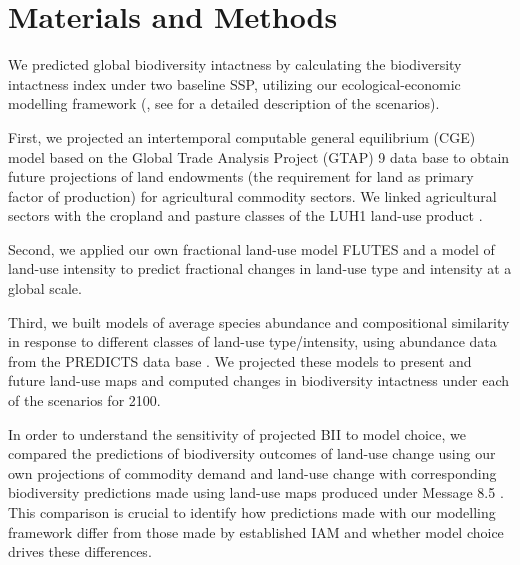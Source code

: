 \documentclass[titlesmallcaps,copyrightpage]{uomthesis}\usepackage[]{graphicx}\usepackage[]{color}
\begin{document}
\section{Materials and Methods}
We predicted global biodiversity intactness by calculating the biodiversity intactness index \citep[BII,][]{scholes_biodiversity_2005} under two baseline SSP, utilizing our ecological-economic modelling framework (, see  for a detailed description of the scenarios).

First, we projected an intertemporal computable general equilibrium (CGE) model based on the Global Trade Analysis Project (GTAP) 9 data base \citep[GTAP INT,][]{van_ha_building_2017} to obtain future projections of land endowments (the requirement for land as primary factor of production) for agricultural commodity sectors. We linked agricultural sectors with the cropland and pasture classes of the LUH1 land-use product \citep[Land-Use Harmonization Project 1,][]{hoskins_downscaling_2016}. 

Second, we applied our own fractional land-use model FLUTES \citep[,][]{kapitza_predictive_2020} and a model of land-use intensity \citep[based on][]{newbold_global_2015} to predict fractional changes in land-use type and intensity at a global scale. 

Third, we built models of average species abundance and compositional similarity in response to different classes of land-use type/intensity, using abundance data from the PREDICTS data base \citep[Projecting Responses of Ecological Diversity in Changing Terrestrial Systems, ][]{hudson_predicts_2014}. We projected these models to present and future land-use maps and computed changes in biodiversity intactness under each of the scenarios for 2100.

In order to understand the sensitivity of projected BII to model choice, we compared the predictions of biodiversity outcomes of land-use change using our own projections of commodity demand and land-use change with corresponding biodiversity predictions made using land-use maps produced under Message 8.5 \citep{riahi_scenarios_2007}. This comparison is crucial to identify how predictions made with our modelling framework differ from those made by established IAM and whether model choice drives these differences.
\end{document}
